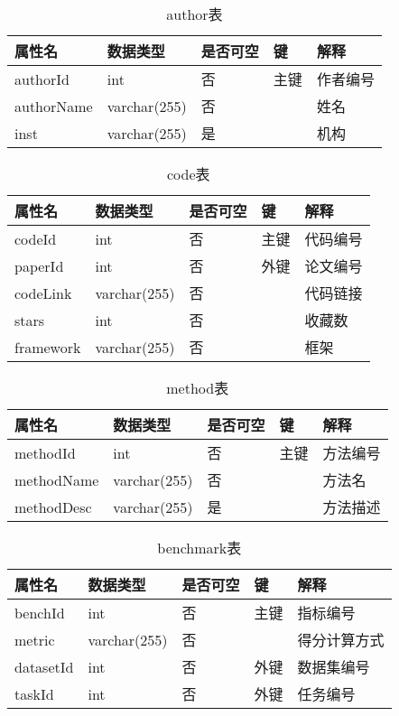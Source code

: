 \begin{table}[htbp!]
    \centering
    \caption{author表}
    \begin{tabular}{|l|l|l|l|l|}
    \hline
        属性名 & 数据类型 & 是否可空 & 键 & 解释 \\ \hline
        authorId & int & 否 & 主键 & 作者编号 \\ \hline
        authorName & varchar(255) & 否 &  & 姓名 \\ \hline
        inst & varchar(255) & 是 &  & 机构 \\ \hline
    \end{tabular}
    \label{tab:author}
\end{table}

\begin{table}[htbp!]
    \centering
    \caption{code表}
    \begin{tabular}{|l|l|l|l|l|}
    \hline
        属性名 & 数据类型 & 是否可空 & 键 & 解释 \\ \hline
        codeId & int & 否 & 主键 & 代码编号 \\ \hline
        paperId & int & 否 & 外键 & 论文编号 \\ \hline
        codeLink & varchar(255) & 否 &  & 代码链接 \\ \hline
        stars & int & 否 &  & 收藏数 \\ \hline
        framework & varchar(255) & 否 &  & 框架 \\ \hline
    \end{tabular}
    \label{tab:code}
\end{table}

\begin{table}[htbp!]
    \centering
    \caption{method表}
    \begin{tabular}{|l|l|l|l|l|}
    \hline
        属性名 & 数据类型 & 是否可空 & 键 & 解释 \\ \hline
        methodId & int & 否 & 主键 & 方法编号 \\ \hline
        methodName & varchar(255) & 否 &  & 方法名 \\ \hline
        methodDesc & varchar(255) & 是 &  & 方法描述 \\ \hline
    \end{tabular}
    \label{tab:method}
\end{table}

\begin{table}[htbp!]
    \centering
    \caption{benchmark表}
    \begin{tabular}{|l|l|l|l|l|}
    \hline
        属性名 & 数据类型 & 是否可空 & 键 & 解释 \\ \hline
        benchId & int & 否 & 主键 & 指标编号 \\ \hline
        metric & varchar(255) & 否 &  & 得分计算方式 \\ \hline
        datasetId & int & 否 & 外键 & 数据集编号 \\ \hline
        taskId & int & 否 & 外键 & 任务编号 \\ \hline
    \end{tabular}
    \label{tab:benchmark}
\end{table}

